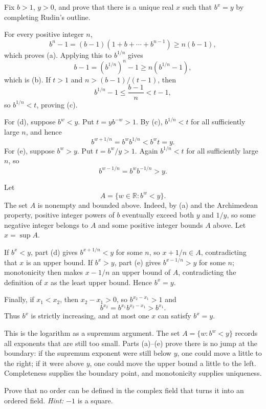 \documentclass[main.tex]{subfiles}
\begin{document}
Fix $b>1$, $y>0$, and prove that there is a unique real $x$ such that $b^x=y$ by completing Rudin's
outline.

\begin{SolutionBlue}
For every positive integer $n$,
\[
b^n-1=(b-1)(1+b+\cdots+b^{n-1})\ge n(b-1),
\]
which proves (a). Applying this to $b^{1/n}$ gives
\[
b-1=(b^{1/n})^n-1\ge n(b^{1/n}-1),
\]
which is (b). If $t>1$ and $n>(b-1)/(t-1)$, then
\[
b^{1/n}-1\le \frac{b-1}{n}<t-1,
\]
so $b^{1/n}<t$, proving (c).

For (d), suppose $b^w<y$. Put $t=yb^{-w}>1$. By (c), $b^{1/n}<t$ for all sufficiently large $n$,
and hence
\[
b^{w+1/n}=b^w b^{1/n}<b^w t=y.
\]
For (e), suppose $b^w>y$. Put $t=b^w/y>1$. Again $b^{1/n}<t$ for all sufficiently large $n$, so
\[
b^{w-1/n}=b^w b^{-1/n}>y.
\]

Let
\[
A=\{w\in\mathbb R:b^w<y\}.
\]
The set $A$ is nonempty and bounded above. Indeed, by (a) and the Archimedean property, positive
integer powers of $b$ eventually exceed both $y$ and $1/y$, so some negative integer belongs to $A$
and some positive integer bounds $A$ above. Let $x=\sup A$.

If $b^x<y$, part (d) gives $b^{x+1/n}<y$ for some $n$, so $x+1/n\in A$, contradicting that $x$ is an
upper bound. If $b^x>y$, part (e) gives $b^{x-1/n}>y$ for some $n$; monotonicity then makes
$x-1/n$ an upper bound of $A$, contradicting the definition of $x$ as the least upper bound. Hence
$b^x=y$.

Finally, if $x_1<x_2$, then $x_2-x_1>0$, so $b^{x_2-x_1}>1$ and
\[
b^{x_2}=b^{x_1}b^{x_2-x_1}>b^{x_1}.
\]
Thus $b^x$ is strictly increasing, and at most one $x$ can satisfy $b^x=y$.
\end{SolutionBlue}

\begin{Reflection}
This is the logarithm as a supremum argument. The set $A=\{w:b^w<y\}$ records all exponents that are
still too small. Parts (a)--(e) prove there is no jump at the boundary: if the supremum exponent were
still below $y$, one could move a little to the right; if it were above $y$, one could move the upper
bound a little to the left. Completeness supplies the boundary point, and monotonicity supplies
uniqueness.
\end{Reflection}

Prove that no order can be defined in the complex field that turns it into an ordered field.
\emph{Hint:} $-1$ is a square.
\end{document}
